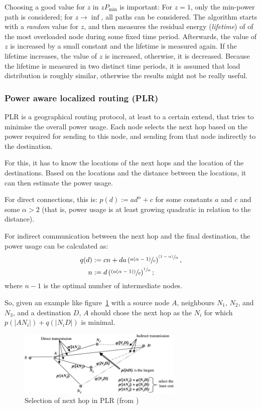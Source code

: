 \documentclass[conference]{IEEEtran}
\begin{document}
Choosing a good value for $z$ in $zP_{\min}$ is important: For $z=1$, only
the min-power path is considered; for $z \to \inf$, all paths can be
considered. The algorithm starts with a \textit{random} value for $z$, and
then measures the residual energy (\textit{lifetime}) of of the most overloaded node during some
fixed time period. Afterwards, the value of $z$ is increased by a small constant
and the lifetime is measured again. If the lifetime increases, the value of $z$
is increased, otherwise, it is decreased. Because the lifetime is measured
in two distinct time periods, it is assumed that load distribution is roughly
similar, otherwise the results might not be really useful.

\subsubsection{Power aware localized routing (PLR)}
PLR\cite{stojmenovic2001power} is a geographical routing protocol, at least
to a certain extend, that tries to minimise the overall power usage. Each node
selects the next hop based on the power required for sending to this node, and
sending from that node indirectly to the destination.

For this, it has to know the locations of the next hops and the location of
the destinations. Based on the locations and the distance between the locations,
it can then estimate the power usage.

For direct connections, this is:
\( p(d) := ad^{\alpha} + c \)
for some constants $a$ and $c$ and some $\alpha > 2$ (that is, power usage
is at least growing quadratic in relation to the distance).

For indirect communication between the next hop and the final destination,
the power usage can be calculated as:
\begin{align*}
   q(d) &:= cn + da \left(\sfrac{a(\alpha - 1)}{c}\right)^{\sfrac{(1-\alpha)}{\alpha}}, \\
      n &:= d\left(\sfrac{(a(\alpha - 1))}{c}\right)^{\sfrac{1}{\alpha}};
\end{align*}
where $n-1$ is the optimal number of intermediate nodes\cite{stojmenovic2001power}.

So, given an example like figure~\ref{plrexample} with a source node $A$, neighbours $N_{1}$, $N_{2}$, and $N_{3}$, and a
destination $D$, $A$ should chose the next hop as the $N_{i}$ for which
$p(|AN_{i}|) + q(|N_{i}D|)$ is minimal.

\begin{figure}
\centering
\includegraphics[width=0.7\textwidth]{images/plr-example}
\caption{Selection of next hop in PLR (from \cite{alotaibi2012survey})}
\label{plrexample}
\end{figure}
\end{document}
